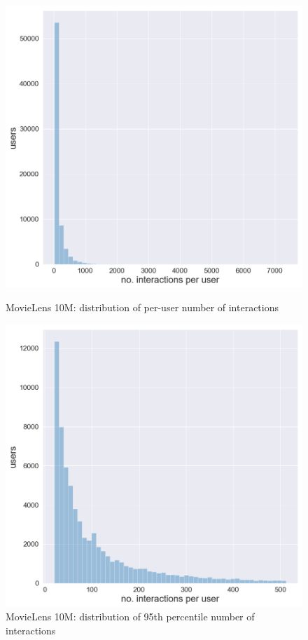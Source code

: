 \begin{figure}[htbp]
    \begin{minipage}{0.48\textwidth}
    \centering
      \includegraphics[width=\textwidth]{datasets/Movielens10M_user_interaction_distr.png}
      \caption{MovieLens 10M: distribution of per-user number of interactions}
      \label{fig:ml10m_dist}
    \end{minipage}
    \hfill
    \begin{minipage}{0.48\textwidth}
    \centering
     \includegraphics[width=\textwidth]{datasets/Movielens10M_95th_interaction_distr.png} 
     \caption{MovieLens 10M: distribution of 95th percentile number of interactions}
      \label{fig:ml10m_dist_95}
    \end{minipage}
\end{figure}

